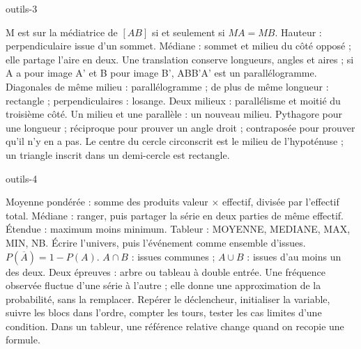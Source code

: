 \begin{blocEdition}{outils-3}

M est sur la médiatrice de $[AB]$ si et seulement si $MA=MB$. Hauteur : perpendiculaire issue d’un sommet. Médiane : sommet et milieu du côté opposé ; elle partage l’aire en deux.
Une translation conserve longueurs, angles et aires ; si A a pour image A’ et B pour image B’, ABB’A’ est un parallélogramme. Diagonales de même milieu : parallélogramme ; de plus de même longueur : rectangle ; perpendiculaires : losange.
Deux milieux : parallélisme et moitié du troisième côté. Un milieu et une parallèle : un nouveau milieu.
Pythagore pour une longueur ; réciproque pour prouver un angle droit ; contraposée pour prouver qu’il n’y en a pas. Le centre du cercle circonscrit est le milieu de l’hypoténuse ; un triangle inscrit dans un demi-cercle est rectangle.
\end{blocEdition}
\begin{blocEdition}{outils-4}

Moyenne pondérée : somme des produits valeur $\times$ effectif, divisée par l’effectif total. Médiane : ranger, puis partager la série en deux parties de même effectif. Étendue : maximum moins minimum. Tableur : MOYENNE, MEDIANE, MAX, MIN, NB.
Écrire l’univers, puis l’événement comme ensemble d’issues. $P(\overline A)=1-P(A)$. $A\cap B$ : issues communes ; $A\cup B$ : issues d’au moins un des deux. Deux épreuves : arbre ou tableau à double entrée.
Une fréquence observée fluctue d’une série à l’autre ; elle donne une approximation de la probabilité, sans la remplacer.
Repérer le déclencheur, initialiser la variable, suivre les blocs dans l’ordre, compter les tours, tester les cas limites d’une condition. Dans un tableur, une référence relative change quand on recopie une formule.
\end{blocEdition}
